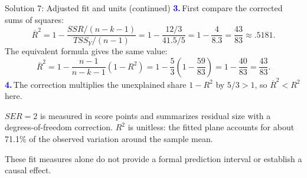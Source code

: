 \documentclass[notes,10pt, aspectratio=169]{beamer}
\newcommand{\answerpart}[1]{\textcolor{blue}{\textbf{#1.}}\,}
\begin{document}
\begin{frame}{Solution 7: Adjusted fit and units (continued)}
\small
\answerpart{3}First compare the corrected sums of squares:
\[
\overline R^2=1-\frac{SSR/(n-k-1)}{TSS_Y/(n-1)}
=1-\frac{12/3}{41.5/5}
=1-\frac4{8.3}=\boxed{\frac{43}{83}\approx.5181}.
\]
The equivalent formula gives the same value:
\[
\overline R^2
=1-\frac{n-1}{n-k-1}(1-R^2)
=1-\frac53\left(1-\frac{59}{83}\right)
=1-\frac{40}{83}=\frac{43}{83}.
\]
\answerpart{4}The correction multiplies the unexplained share $1-R^2$ by $5/3>1$, so $\overline R^2<R^2$ here.

\par\vspace{8pt}
$SER=2$ is measured in score points and summarizes residual size with a degrees-of-freedom correction. $R^2$ is unitless: the fitted plane accounts for about 71.1\% of the observed variation around the sample mean.

\par\vspace{6pt}
These fit measures alone do not provide a formal prediction interval or establish a causal effect.
\end{frame}
\fi
\end{document}
